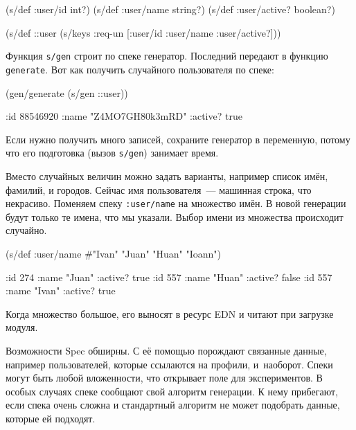 \else

\begin{english}
  \begin{clojure}
(s/def :user/id int?)
(s/def :user/name string?)
(s/def :user/active? boolean?)

(s/def ::user (s/keys :req-un [:user/id
                               :user/name
                               :user/active?]))
  \end{clojure}
\end{english}

\fi

\noindent
Функция \verb|s/gen| строит по спеке генератор. Последний передают в функцию
\verb|generate|. Вот как получить случайного пользователя по спеке:

\begin{english}
  \begin{clojure}
(gen/generate (s/gen ::user))

{:id 88546920
 :name "Z4MO7GH80k3mRD"
 :active? true}
  \end{clojure}
\end{english}

Если нужно получить много записей, сохраните генератор в переменную, потому что
его подготовка (вызов \verb|s/gen|) занимает время.

Вместо случайных величин можно задать варианты, например список имён, фамилий, и
городов. Сейчас имя пользователя~--- машинная строка, что некрасиво. Поменяем
спеку \texttt{:user\-/name} на множество имён.  В новой генерации будут только
те имена, что мы указали. Выбор имени из множества происходит случайно.

\begin{english}
  \begin{clojure}
(s/def :user/name
  #{"Ivan" "Juan" "Huan" "Ioann"})

{:id 274 :name "Juan" :active? true}
{:id 557 :name "Huan" :active? false}
{:id 557 :name "Ivan" :active? true}
  \end{clojure}
\end{english}

Когда множество большое, его выносят в ресурс EDN и читают при загрузке модуля.

Возможности Spec обширны. С её помощью порождают связанные данные, например
пользователей, которые ссылаются на профили, и~наоборот. Спеки могут быть любой
вложенности, что открывает поле для экспериментов. В особых случаях спеке
сообщают свой алгоритм генерации. К нему прибегают, если спека очень сложна и
стандартный алгоритм не может подобрать данные, которые ей подходят.

